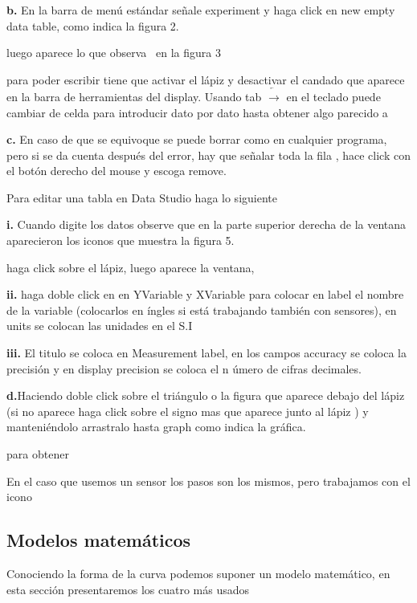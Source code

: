 \documentclass[12pt]{article}
\begin{document}
\textbf{b. }En la barra de men\'{u} est\'{a}ndar se\~{n}ale experiment y
haga click en new empty data table, como indica la figura 2.

luego aparece lo que observa \ en la figura 3

para poder escribir tiene que activar el l\'{a}piz y desactivar el candado
que aparece en la barra de herramientas del display. Usando tab $%
\overleftarrow{\rightarrow }$ en el teclado puede cambiar de celda para
introducir dato por dato hasta obtener algo parecido a

\textbf{c. }En caso de que se equivoque se puede borrar como en cualquier
programa, pero si se da cuenta despu\'{e}s del error, hay que se\~{n}alar
toda la fila , hace click con el bot\'{o}n derecho del mouse y escoga remove.

Para editar una tabla en Data Studio haga lo siguiente 

\textbf{i. }Cuando digite los datos observe que en la parte superior derecha
de la ventana aparecieron los iconos que muestra la figura 5.

haga click sobre el l\'{a}piz, luego aparece la ventana, 

\textbf{ii. }haga doble click en en YVariable y XVariable para colocar en
label el nombre de la variable (colocarlos en \'{i}ngles si est\'{a}
trabajando tambi\'{e}n con sensores), en units se colocan las unidades en el
S.I

\textbf{iii. }El titulo se coloca en Measurement label, en los campos
accuracy se coloca la precisi\'{o}n y en display precision se coloca el n%
\'{u}mero de cifras decimales.

\textbf{d.}Haciendo doble click sobre el tri\'{a}ngulo o la figura que
aparece debajo del l\'{a}piz (si no aparece haga click sobre el signo mas
que aparece junto al l\'{a}piz ) y manteni\'{e}ndolo arrastralo hasta graph
como indica la gr\'{a}fica.

para obtener

En el caso que usemos un sensor los pasos son los mismos, pero trabajamos
con el icono 

\subsection{Modelos matem\'{a}ticos}

Conociendo la forma de la curva podemos suponer un modelo matem\'{a}tico, en
esta secci\'{o}n presentaremos los cuatro m\'{a}s usados
\end{document}
